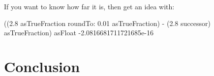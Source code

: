 \documentclass[a4paper,10pt,twoside]{book}
\begin{document}
If you want to know how far it is, then get an idea with:

\begin{code}{}
((2.8 asTrueFraction roundTo: 0.01 asTrueFraction) - (2.8 successor)
asTrueFraction) asFloat
-2.0816681711721685e-16
\end{code}



\section{Conclusion}



\ifx\wholebook\relax\else
   
   
\end{document}

